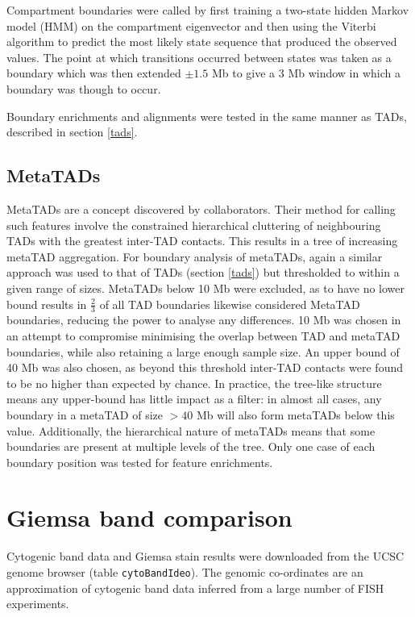 \documentclass[a4paper,10pt,oneside]{book}
\begin{document}
Compartment boundaries were called by first training a two-state hidden
Markov model (HMM) on the compartment eigenvector and then using the
Viterbi algorithm to predict the most likely state sequence that
produced the observed values. The point at which transitions occurred
between states was taken as a boundary which was then extended $\pm 1.5$
Mb to give a 3 Mb window in which a boundary was though to occur.

Boundary enrichments and alignments were tested in the same manner as TADs, described in section \ref{tads}.

\subsection{MetaTADs}\label{sec:metatad}

MetaTADs are a concept discovered by collaborators. Their method for calling such features involve the constrained hierarchical cluttering of neighbouring TADs with the greatest inter-TAD contacts. This results in a tree of increasing metaTAD aggregation. For boundary analysis of metaTADs, again a similar approach was used to that of TADs (section \ref{tads}) but thresholded to within a given range of sizes. MetaTADs below 10 Mb were excluded, as to have no lower bound results in $\frac{2}{3}$ of all TAD boundaries likewise considered MetaTAD boundaries, reducing the power to analyse any differences. 10 Mb was chosen in an attempt to compromise minimising the overlap between TAD and metaTAD boundaries, while also retaining a large enough sample size. An upper bound of 40 Mb was also chosen, as beyond this threshold inter-TAD contacts were found to be no higher than expected by chance. In practice, the tree-like structure means any upper-bound has little impact as a filter: in almost all cases, any boundary in a metaTAD of size $> 40$ Mb will also form metaTADs below this value. Additionally, the hierarchical nature of metaTADs means that some boundaries are present at multiple levels of the tree. Only one case of each boundary position was tested for feature enrichments.

\section{Giemsa band comparison}\label{giemsa-band-comparison}

Cytogenic band data and Giemsa stain results were downloaded from the
UCSC genome browser (table \texttt{cytoBandIdeo}). The genomic
co-ordinates are an approximation of cytogenic band data inferred from a
large number of FISH experiments.\citep{Furey2003}
\end{document}
